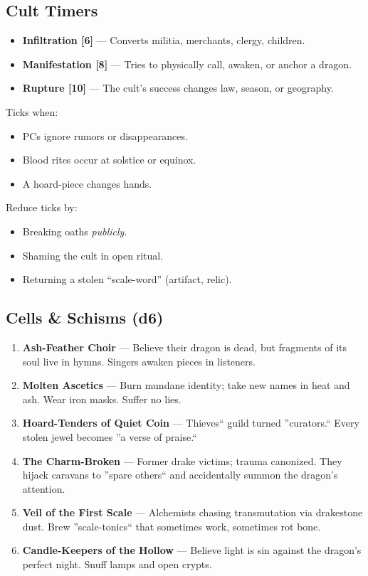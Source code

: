 \documentclass[11pt,letterpaper]{article}
\begin{document}
\subsection{Cult Timers}

\begin{itemize}[leftmargin=*]
\item \textbf{Infiltration [6]} --- Converts militia, merchants, clergy, children.
\item \textbf{Manifestation [8]} --- Tries to physically call, awaken, or anchor a dragon.
\item \textbf{Rupture [10]} --- The cult's success changes law, season, or geography.
\end{itemize}

Ticks when:
\begin{itemize}[leftmargin=*]
\item PCs ignore rumors or disappearances.
\item Blood rites occur at solstice or equinox.
\item A hoard-piece changes hands.
\end{itemize}

Reduce ticks by:
\begin{itemize}[leftmargin=*]
\item Breaking oaths \textit{publicly}.
\item Shaming the cult in open ritual.
\item Returning a stolen ``scale-word'' (artifact, relic).
\end{itemize}

\subsection{Cells \& Schisms (d6)}

\begin{enumerate}[leftmargin=*]
\item \textbf{Ash-Feather Choir} --- Believe their dragon is dead, but fragments of its soul live in hymns. Singers awaken pieces in listeners.
\item \textbf{Molten Ascetics} --- Burn mundane identity; take new names in heat and ash. Wear iron masks. Suffer no lies.
\item \textbf{Hoard-Tenders of Quiet Coin} --- Thieves`` guild turned ''curators.`` Every stolen jewel becomes ''a verse of praise.``
\item \textbf{The Charm-Broken} --- Former drake victims; trauma canonized. They hijack caravans to ''spare others`` and accidentally summon the dragon's attention.
\item \textbf{Veil of the First Scale} --- Alchemists chasing transmutation via drakestone dust. Brew ''scale-tonics`` that sometimes work, sometimes rot bone.
\item \textbf{Candle-Keepers of the Hollow} --- Believe light is sin against the dragon's perfect night. Snuff lamps and open crypts.
\end{enumerate}
\end{document}
